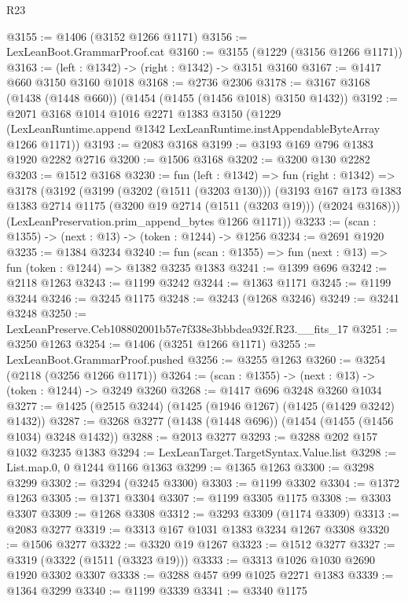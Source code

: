 \begin{lexlean}{R23}
\begin{coremodule}
@3155 := @1406 (@3152 @1266 @1171)
@3156 := LexLeanBoot.GrammarProof.cat
@3160 := @3155 (@1229 (@3156 @1266 @1171))
@3163 := (left : @1342) -> (right : @1342) -> @3151 @3160
@3167 := @1417 @660 @3150 @3160 @1018
@3168 := @2736 @2306
@3178 := @3167 @3168 (@1438 (@1448 @660)) (@1454 (@1455 (@1456 @1018) @3150 @1432))
@3192 := @2071
    @3168
    @1014
    @1016
    @2271
    @1383
    @3150
    (@1229 (LexLeanRuntime.append @1342 LexLeanRuntime.instAppendableByteArray @1266 @1171))
@3193 := @2083 @3168
@3199 := @3193 @169 @796 @1383 @1920 @2282 @2716
@3200 := @1506 @3168
@3202 := @3200 @130 @2282
@3203 := @1512 @3168
@3230 := fun (left : @1342) =>
  fun (right : @1342) =>
  @3178
    (@3192
      (@3199
        (@3202 (@1511 (@3203 @130)))
        (@3193
          @167
          @173
          @1383
          @1383
          @2714
          @1175
          (@3200 @19 @2714 (@1511 (@3203 @19)))
          (@2024 @3168)))
      (LexLeanPreservation.prim_append_bytes @1266 @1171))
@3233 := (scan : @1355) -> (next : @13) -> (token : @1244) -> @1256
@3234 := @2691 @1920
@3235 := @1384 @3234
@3240 := fun (scan : @1355) => fun (next : @13) => fun (token : @1244) => @1382 @3235 @1383
@3241 := @1399 @696
@3242 := @2118 @1263
@3243 := @1199 @3242
@3244 := @1363 @1171
@3245 := @1199 @3244
@3246 := @3245 @1175
@3248 := @3243 (@1268 @3246)
@3249 := @3241 @3248
@3250 := LexLeanPreserve.Ceb108802001b57e7f338e3bbbdea932f.R23.__fits_17
@3251 := @3250 @1263
@3254 := @1406 (@3251 @1266 @1171)
@3255 := LexLeanBoot.GrammarProof.pushed
@3256 := @3255 @1263
@3260 := @3254 (@2118 (@3256 @1266 @1171))
@3264 := (scan : @1355) -> (next : @13) -> (token : @1244) -> @3249 @3260
@3268 := @1417 @696 @3248 @3260 @1034
@3277 := @1425 (@2515 @3244) (@1425 (@1946 @1267) (@1425 (@1429 @3242) @1432))
@3287 := @3268 @3277 (@1438 (@1448 @696)) (@1454 (@1455 (@1456 @1034) @3248 @1432))
@3288 := @2013 @3277
@3293 := @3288 @202 @157 @1032 @3235 @1383
@3294 := LexLeanTarget.TargetSyntax.Value.list
@3298 := List.map.{0, 0} @1244 @1166 @1363
@3299 := @1365 @1263
@3300 := @3298 @3299
@3302 := @3294 (@3245 @3300)
@3303 := @1199 @3302
@3304 := @1372 @1263
@3305 := @1371 @3304
@3307 := @1199 @3305 @1175
@3308 := @3303 @3307
@3309 := @1268 @3308
@3312 := @3293 @3309 (@1174 @3309)
@3313 := @2083 @3277
@3319 := @3313 @167 @1031 @1383 @3234 @1267 @3308
@3320 := @1506 @3277
@3322 := @3320 @19 @1267
@3323 := @1512 @3277
@3327 := @3319 (@3322 (@1511 (@3323 @19)))
@3333 := @3313 @1026 @1030 @2690 @1920 @3302 @3307
@3338 := @3288 @457 @99 @1025 @2271 @1383
@3339 := @1364 @3299
@3340 := @1199 @3339
@3341 := @3340 @1175

\end{coremodule}
\end{lexlean}
